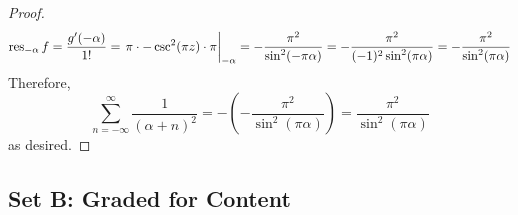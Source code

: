 \documentclass[../psets.tex]{subfiles}
\begin{document}
\begin{enumerate}[ref={A.\arabic*}]
\begin{proof}
\begin{equation*}
            \res_{-\alpha}f = \frac{g'(-\alpha)}{1!}
            = \eval{\pi\cdot -\csc^2(\pi z)\cdot\pi}_{-\alpha}
            = -\frac{\pi^2}{\sin^2(-\pi\alpha)}
            = -\frac{\pi^2}{(-1)^2\sin^2(\pi\alpha)}
            = -\frac{\pi^2}{\sin^2(\pi\alpha)}
        \end{equation*}
        Therefore,
        \begin{equation*}
            \sum_{n=-\infty}^\infty\frac{1}{(\alpha+n)^2} = -\left( -\frac{\pi^2}{\sin^2(\pi\alpha)} \right)
            = \frac{\pi^2}{\sin^2(\pi\alpha)}
        \end{equation*}
        as desired.
    \end{proof}
\end{enumerate}


\subsection*{Set B: Graded for Content}
\end{document}
